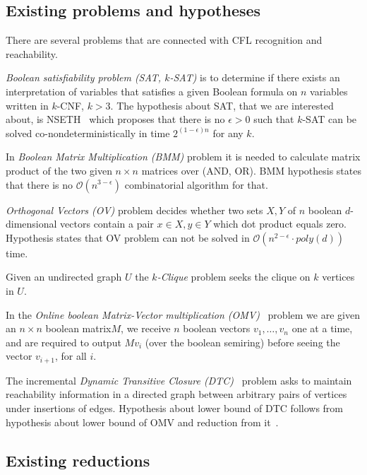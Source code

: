 \documentclass[acmsmall,review,nonacm]{acmart}\settopmatter{printfolios=true,printccs=false,printacmref=false}
\begin{document}
	\subsection{Existing problems and hypotheses}
	
	There are several problems that are connected with CFL recognition and reachability. 
	
	\emph{Boolean satisfiability problem (SAT, $k$-SAT)} is to determine if there exists an interpretation of variables that satisfies a given Boolean formula on $n$ variables written in $k$-CNF, $k > 3$. The hypothesis about SAT, that we are interested about, is NSETH~\cite{10.1145/2840728.2840746} which proposes that there is no $\epsilon > 0$ such that $k$-SAT can be solved co-nondeterministically in time $2^{(1 - \epsilon) n}$ for any $k$.
	
	In \emph{Boolean Matrix Multiplication (BMM)} problem it is needed to calculate matrix product of the two given $n \times n$ matrices over (AND, OR). BMM hypothesis states that there is no $\mathcal{O}(n^{3 - \epsilon})$ combinatorial algorithm for that. 
	
	\emph{Orthogonal Vectors (OV)} problem decides whether two sets $X, Y$ of $n$ boolean $d$-dimensional vectors contain a pair $x \in X, y \in Y$ which dot product equals zero. Hypothesis states that OV problem can not be solved in $\mathcal{O}(n^{2 - \epsilon} \cdot poly(d))$ time. 
	
	Given an undirected graph $U$ the \emph{$k$-Clique} problem seeks the clique on $k$ vertices in $U$.  
	
	In the \emph{Online boolean Matrix-Vector multiplication (OMV)}~\cite{10.5555/3039686.3039828} problem we are given an $n \times n$ boolean matrix$M$, we receive $n$ boolean vectors $v_1, \ldots, v_n$ one at a time, and are required to output $Mv_i$ (over the boolean semiring) before seeing the vector $v_{i+1}$, for all $i$.
	
	The incremental \emph{Dynamic Transitive Closure (DTC)}~\cite{Hanauer2020FasterFD} problem asks to maintain reachability information in a directed graph between arbitrary pairs of vertices under insertions of edges. Hypothesis about lower bound  of DTC follows from hypothesis about lower bound of OMV and reduction from it~\cite{10.1145/2746539.2746609}.
	
	\subsection{Existing reductions}
	
\end{document}
